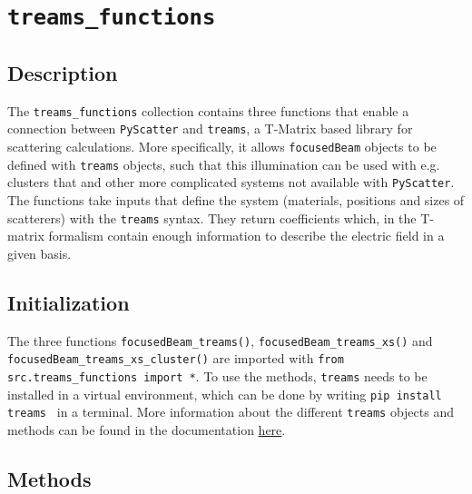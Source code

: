 \section{\texttt{treams\_functions}}

\subsection{Description}
The \texttt{treams\_functions} collection contains three functions that enable a connection between \texttt{PyScatter} and \texttt{treams}, a T-Matrix based library for scattering calculations\cite{treams}. 
More specifically, it allows \texttt{focusedBeam} objects to be defined with \texttt{treams} objects, such that this illumination can be used with e.g. clusters that and other more complicated systems not available with \texttt{PyScatter}.
The functions take inputs that define the system (materials, positions and sizes of scatterers) with the \texttt{treams} syntax. They return coefficients which, in the T-matrix formalism contain enough information to describe the electric field in a given basis.

\subsection{Initialization}
The three functions \texttt{focusedBeam\_treams()}, \texttt{focusedBeam\_treams\_xs()} and \texttt{focusedBeam\_treams\_xs\_cluster()} are imported with \texttt{from src.treams\_functions import *}. \newline
To use the methods, \texttt{treams} needs to be installed in a virtual environment, which can be done by writing \texttt{pip install treams
} in a terminal.
More information about the different \texttt{treams} objects and methods can be found in the documentation \href{https://tfp-photonics.github.io/treams/index.html}{here}.


\subsection{Methods}

